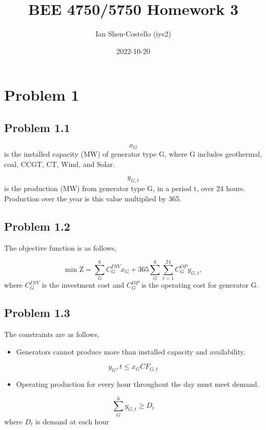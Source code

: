 \documentclass[12pt,a4paper]{article}
\title{ BEE 4750/5750 Homework 3 }
\author{ Ian Shen-Costello (iys2) }
\date{ 2022-10-20 }
\begin{document}
\maketitle





\section{Problem 1}
\subsection{Problem 1.1}
\[
x_G
\]
is the installed capacity (MW) of generator type G, where G includes geothermal, coal, CCGT, CT, Wind, and Solar.

\[
y_{G,t}
\]
is the production (MW) from generator type G, in a period t, over 24 hours.  Production over the year is this value multiplied by 365.

\subsection{Problem 1.2}
The objective function is as follows,

\[
\text{min Z} = \sum_{G}^6 C_G^{INV} x_G + 365 \sum_{G}^6 \sum_{t=1}^{24} C_G^{OP} y_{G,t} \text{,}
\]
where $C_G^{INV}$ is the investment cost and $C_G^{OP}$ is the operating cost for generator G.

\subsection{Problem 1.3}
The constraints are as follows,

\begin{itemize}
\item Generators cannot produce more than installed capacity and availability.

\end{itemize}
\[
y_G,t \le x_G {CF}_{G,t}
\]
\begin{itemize}
\item Operating production for every hour throughout the day must meet demand.

\end{itemize}
\[
\sum_{G}^6 y_{G,t} \ge D_t
\]
where $D_t$ is demand at each hour
\end{document}
